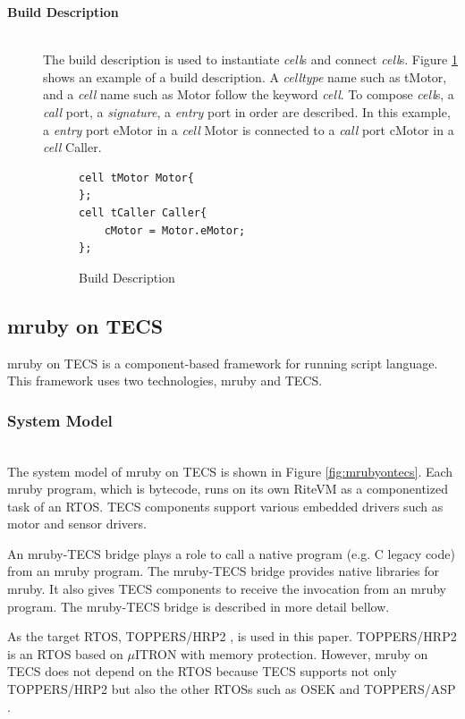 \documentclass[conference,compsoc]{IEEEtran}
\begin{document}
\begin{description}
    \item[{\bf Build Description}]\mbox{}\\
        The build description is used to instantiate {\it cell}s and connect {\it cell}s.
        Figure \ref{build} shows an example of a build description.
        A {\it celltype} name such as tMotor, and a {\it cell} name such as Motor follow the keyword {\it cell}.
        To compose {\it cell}s, a {\it call} port, a {\it signature}, a {\it entry} port in order are described.
        In this example, a {\it entry} port eMotor in a {\it cell} Motor is connected to a {\it call} port cMotor in a {\it cell} Caller.\\
\begin{figure}[t]
\centering
\begin{lstlisting}
cell tMotor Motor{
};
cell tCaller Caller{
    cMotor = Motor.eMotor;
};
\end{lstlisting}
\caption{Build Description}
\label{build}
\end{figure}

\end{description}

\subsection{mruby on TECS}
\label{sec:mruby on TECS}
mruby on TECS is a component-based framework for running script language.
This framework uses two technologies, mruby and TECS.

\subsubsection{System Model}\mbox{}\\

The system model of mruby on TECS is shown in Figure \ref{fig:mrubyontecs}.
Each mruby program, which is bytecode, runs on its own RiteVM as a componentized task of an RTOS.
TECS components support various embedded drivers such as motor and sensor drivers.

An mruby-TECS bridge plays a role to call a native program (e.g. C legacy code) from an mruby program.
The mruby-TECS bridge provides native libraries for mruby.
It also gives TECS components to receive the invocation from an mruby program.
The mruby-TECS bridge is described in more detail bellow.

As the target RTOS, TOPPERS/HRP2 \cite{url:HRP2}, \cite{par:hr-tecs} is used in this paper.
TOPPERS/HRP2 is an RTOS based on $\mu$ITRON \cite{par:microITRON} with memory protection.
However, mruby on TECS does not depend on the RTOS because TECS supports not only TOPPERS/HRP2 but also the other RTOSs such as OSEK \cite{par:OSEK} and TOPPERS/ASP \cite{url:ASP}.
\end{document}
